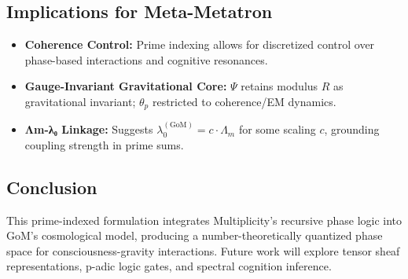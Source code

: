 \documentclass[11pt]{article}
\begin{document}
\subsection{Implications for Meta-Metatron}
\begin{itemize}
    \item \textbf{Coherence Control:} Prime indexing allows for discretized control over phase-based interactions and cognitive resonances.
    \item \textbf{Gauge-Invariant Gravitational Core:} $\Psi$ retains modulus $R$ as gravitational invariant; $\theta_p$ restricted to coherence/EM dynamics.
    \item \textbf{Λm-λ₀ Linkage:} Suggests $\lambda_0^{(\text{GoM})} = c \cdot \Lambda_m$ for some scaling $c$, grounding coupling strength in prime sums.
\end{itemize}

\subsection*{Conclusion}
This prime-indexed formulation integrates Multiplicity’s recursive phase logic into GoM’s cosmological model, producing a number-theoretically quantized phase space for consciousness-gravity interactions. Future work will explore tensor sheaf representations, p-adic logic gates, and spectral cognition inference.

\nocite{*}


\end{document}
